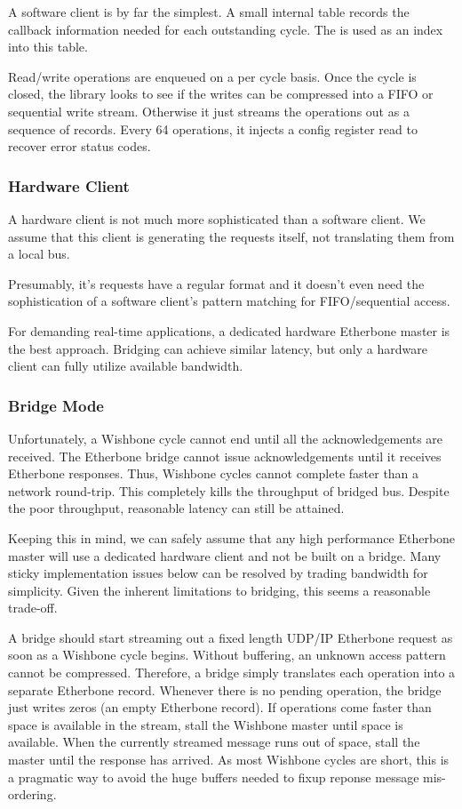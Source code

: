 \documentclass{article}
\begin{document}
A software client is by far the simplest.
A small internal table records the 
callback information needed for each outstanding cycle.
The  is used as an index into this table.

Read/write operations are enqueued on a per cycle basis.
Once the cycle is closed,
the library looks to see if the writes can be compressed into a FIFO or
sequential write stream.
Otherwise it just streams the operations out as a sequence of records.
Every 64 operations, 
it injects a config register read to recover error status codes.

\subsubsection{Hardware Client}

A hardware client is not much more sophisticated than a software client.
We assume that this client is generating the requests itself,
not translating them from a local bus.

Presumably, 
it's requests have a regular format 
and it doesn't even need the sophistication of 
a software client's pattern matching for FIFO/sequential access.

For demanding real-time applications,
a dedicated hardware Etherbone master is the best approach.
Bridging can achieve similar latency,
but only a hardware client can fully utilize available bandwidth.

\subsubsection{Bridge Mode}
\label{sec:bridge}

Unfortunately, 
a Wishbone cycle cannot end until all the acknowledgements are received.
The Etherbone bridge cannot issue acknowledgements until 
it receives Etherbone responses.
Thus, Wishbone cycles cannot complete faster than a network round-trip.
This completely kills the throughput of bridged bus.
Despite the poor throughput, 
reasonable latency can still be attained.

Keeping this in mind,
we can safely assume that any high performance Etherbone master will use 
a dedicated hardware client and not be built on a bridge.
Many sticky implementation issues below can be resolved by 
trading bandwidth for simplicity.
Given the inherent limitations to bridging,
this seems a reasonable trade-off.

A bridge should start streaming out a fixed length UDP/IP Etherbone 
request as soon as a Wishbone cycle begins.
Without buffering,
an unknown access pattern cannot be compressed.
Therefore, 
a bridge simply translates each operation into a separate Etherbone record.
Whenever there is no pending operation,
the bridge just writes zeros (an empty Etherbone record).
If operations come faster than space is available in the stream,
stall the Wishbone master until space is available.
When the currently streamed message runs out of space,
stall the master until the response has arrived.
As most Wishbone cycles are short,
this is a pragmatic way to avoid the huge buffers needed to 
fixup reponse message mis-ordering.
\end{document}
